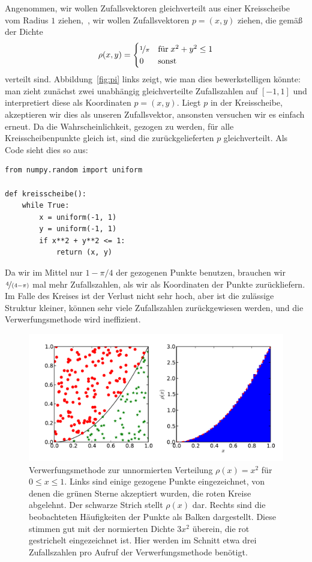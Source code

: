 Angenommen, wir wollen Zufallsvektoren gleichverteilt aus einer
Kreisscheibe vom Radius $1$ ziehen, \dh\,, wir wollen Zufallsvektoren
$p=(x,y)$ ziehen, die gemäß der Dichte
\begin{equation}
  \rho(x, y) = \begin{cases}
    \nicefrac{1}{\pi} & \text{für}\; x^2+y^2\le 1\\
    0     & \text{sonst}
  \end{cases}
\end{equation}
verteilt sind.  Abbildung~\ref{fig:pi} links zeigt, wie man dies
bewerkstelligen könnte: man zieht zunächst zwei unabhängig
gleichverteilte Zufallszahlen auf $[-1,1]$ und interpretiert diese als
Koordinaten $p = (x, y)$. Liegt $p$ in der Kreisscheibe, akzeptieren
wir dies als unseren Zufallsvektor, ansonsten versuchen wir es einfach
erneut. Da die Wahrscheinlichkeit, gezogen zu werden, für alle
Kreisscheibenpunkte gleich ist, sind die zurückgelieferten $p$
gleichverteilt. Als Code sieht dies so aus:
\begin{lstlisting}
from numpy.random import uniform

def kreisscheibe():
    while True:
        x = uniform(-1, 1)
        y = uniform(-1, 1)
        if x**2 + y**2 <= 1:
            return (x, y)
\end{lstlisting}
Da wir im Mittel nur $1-\pi/4$ der gezogenen Punkte benutzen, brauchen
wir $\nicefrac{4}{(4-\pi)}$ mal mehr Zufallszahlen, als wir als
Koordinaten der Punkte zurückliefern. Im Falle des Kreises ist der
Verlust nicht sehr hoch, aber ist die zulässige Struktur kleiner,
können sehr viele Zufallszahlen zurückgewiesen werden, und die
Verwerfungsmethode wird ineffizient.

\begin{figure}
  \centering
  \includegraphics[width=\textwidth]{plots/rejection}
  \caption{Verwerfungsmethode zur unnormierten Verteilung
    $\rho(x)=x^2$ für $0\le x \le 1$. Links sind einige gezogene
    Punkte eingezeichnet, von denen die grünen Sterne akzeptiert
    wurden, die roten Kreise abgelehnt. Der schwarze Strich stellt
    $\rho(x)$ dar. Rechts sind die beobachteten Häufigkeiten der
    Punkte als Balken dargestellt. Diese stimmen gut mit der
    normierten Dichte $3x^2$ überein, die rot gestrichelt
    eingezeichnet ist. Hier werden im Schnitt etwa drei Zufallszahlen
    pro Aufruf der Verwerfungsmethode benötigt.}
  \label{fig:rejection}
\end{figure}

